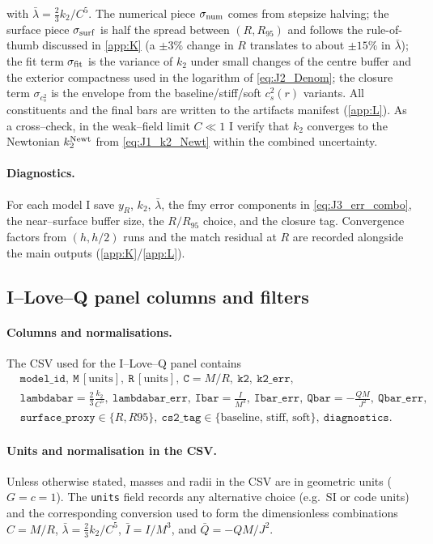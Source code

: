 \documentclass{iopjournal}
\begin{document}
with $\bar\lambda=\tfrac{2}{3}k_2/C^5$. The numerical piece $\sigma_{\rm num}$ comes from stepsize halving; the surface piece $\sigma_{\rm surf}$ is half the spread between $(R,R_{95})$ and follows the rule-of-thumb discussed in \cref{app:K} (a \(\pm3\%\) change in $R$ translates to about \(\pm15\%\) in $\bar\lambda$); the fit term $\sigma_{\rm fit}$ is the variance of $k_2$ under small changes of the centre buffer and the exterior compactness used in the logarithm of \eqref{eq:J2_Denom}; the closure term $\sigma_{c_s^2}$ is the envelope from the baseline/stiff/soft $c_s^2(r)$ variants. All constituents and the final bars are written to the artifacts manifest (\cref{app:L}). As a cross–check, in the weak–field limit $C\ll1$ I verify that $k_2$ converges to the Newtonian $k_2^{\rm Newt}$ from \eqref{eq:J1_k2_Newt} within the combined uncertainty.

\paragraph{Diagnostics.}
For each model I save $y_R$, $k_2$, $\bar\lambda$, the fmy error components in \eqref{eq:J3_err_combo}, the near–surface buffer size, the $R\!/R_{95}$ choice, and the closure tag. Convergence factors from $(h,h/2)$ runs and the match residual at $R$ are recorded alongside the main outputs (\cref{app:K}/\cref{app:L}).

\subsection{I–Love–Q panel columns and filters}\label{app:J4}
\paragraph{Columns and normalisations.}
The CSV used for the I–Love–Q panel contains
\begin{align*}
&\texttt{model\_id},\
\texttt{M}\,[\mathrm{units}],\
\texttt{R}\,[\mathrm{units}],\
\texttt{C}=M/R,\
\texttt{k2},\
\texttt{k2\_err},\\
&\texttt{lambdabar}=\frac{2}{3}\frac{k_2}{C^5},\
\texttt{lambdabar\_err},\
\texttt{Ibar}=\frac{I}{M^3},\
\texttt{Ibar\_err},\
\texttt{Qbar}=-\frac{QM}{J^2},\
\texttt{Qbar\_err},\\
&\texttt{surface\_proxy}\in\{R,R95\},\
\texttt{cs2\_tag}\in\{\text{baseline, stiff, soft}\},\
\texttt{diagnostics}.
\end{align*}

\paragraph{Units and normalisation in the CSV.}
Unless otherwise stated, masses and radii in the CSV are in geometric units ($G=c=1$). The \texttt{units} field records any alternative choice (e.g.\ SI or code units) and the corresponding conversion used to form the dimensionless combinations $C=M/R$, $\bar\lambda=\tfrac{2}{3}k_2/C^5$, $\bar{I}=I/M^3$, and $\bar{Q}=-QM/J^2$.
\end{document}
